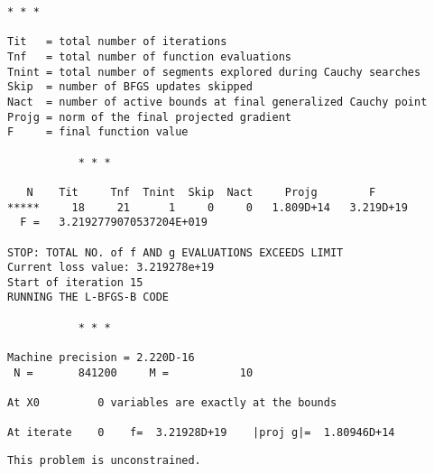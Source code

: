 \documentclass[11pt]{article}
\begin{document}
\begin{Verbatim}[commandchars=\\\{\}]
           * * *

Tit   = total number of iterations
Tnf   = total number of function evaluations
Tnint = total number of segments explored during Cauchy searches
Skip  = number of BFGS updates skipped
Nact  = number of active bounds at final generalized Cauchy point
Projg = norm of the final projected gradient
F     = final function value

           * * *

   N    Tit     Tnf  Tnint  Skip  Nact     Projg        F
*****     18     21      1     0     0   1.809D+14   3.219D+19
  F =   3.2192779070537204E+019

STOP: TOTAL NO. of f AND g EVALUATIONS EXCEEDS LIMIT
Current loss value: 3.219278e+19
Start of iteration 15
RUNNING THE L-BFGS-B CODE

           * * *

Machine precision = 2.220D-16
 N =       841200     M =           10

At X0         0 variables are exactly at the bounds

At iterate    0    f=  3.21928D+19    |proj g|=  1.80946D+14
    \end{Verbatim}

    \begin{Verbatim}[commandchars=\\\{\}]
 This problem is unconstrained.
    \end{Verbatim}
\end{document}
